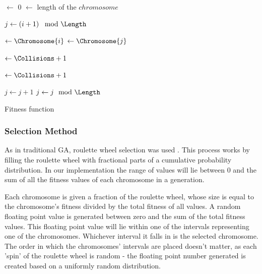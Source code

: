 \documentclass{sig-alternate}
\begin{document}
\begin{algorithm}[t!]
  \SetAlgoLined
  \DontPrintSemicolon
  
  {
    \BlankLine
    
    \Collisions $\leftarrow$ 0\;
    \Length $\leftarrow$ length of the $chromosome$\;
    \BlankLine
    
    {
      $j \leftarrow \left( i + 1 \right) \mod{\Length}$\;
      {
        \Yi $\leftarrow \Chromosome{i}$\;
        \Yj $\leftarrow \Chromosome{j}$\;
        \BlankLine
        
        \If{\Yi == \Yj}
        {
          \Collisions $\leftarrow \Collisions + 1$\; 
        }
        \BlankLine
        
        {
          \Collisions $\leftarrow \Collisions + 1$\;
        }
        \BlankLine
        
        $j \leftarrow j + 1$\;
        $j \leftarrow j \mod{\Length}$\;
      }
    }
    \BlankLine

    {
      \;
    }
    {
      \;
    }
  }
\caption{Fitness function}
\label{alg:fitness}
\end{algorithm}

\subsubsection{Selection Method}
As in traditional GA, roulette wheel selection was used \cite{goldberg1991comparative}. This process works by filling the roulette wheel with fractional parts of a cumulative probability distribution. In our implementation the range of values will lie between 0 and the sum of all the fitness values of each chromosome in a generation.

Each chromosome is given a fraction of the roulette wheel, whose size is equal to the chromosome's fitness divided by the total fitness of all values. A random floating point value is generated between zero and the sum of the total fitness values. This floating point value will lie within one of the intervals representing one of the chromosomes. Whichever interval it falls in is the selected chromosome. The order in which the chromosomes' intervals are placed doesn't matter, as each 'spin' of the roulette wheel is random - the floating point number generated is created based on a uniformly random distribution.
\end{document}
